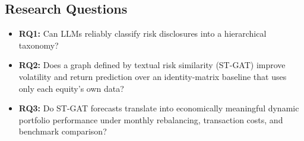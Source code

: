 \documentclass[11pt, a4paper]{article}
\begin{document}
\subsection{Research Questions}
\begin{itemize}
    \item \textbf{RQ1:} Can LLMs reliably classify risk disclosures into a hierarchical taxonomy?
    \item \textbf{RQ2:} Does a graph defined by textual risk similarity (ST-GAT) improve volatility and return prediction over an identity-matrix baseline that uses only each equity's own data?
    \item \textbf{RQ3:} Do ST-GAT forecasts translate into economically meaningful dynamic portfolio performance under monthly rebalancing, transaction costs, and benchmark comparison?
\end{itemize}
\end{document}

